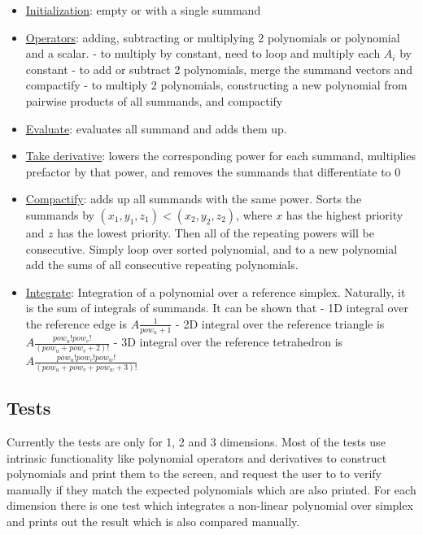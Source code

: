 \documentclass[12pt]{article}
\begin{document}
\begin{itemize}
	\item \uline{Initialization}: empty or with a single summand
	\item \uline{Operators}: adding, subtracting or multiplying 2 polynomials or polynomial and a scalar.
		\subitem - to multiply by constant, need to loop and multiply each $A_i$ by constant
		\subitem - to add or subtract 2 polynomials, merge the summand vectors and compactify
		\subitem - to multiply 2 polynomials, constructing a new polynomial from pairwise products of all summands, and compactify
	\item \uline{Evaluate}: evaluates all summand and adds them up.
	\item \uline{Take derivative}: lowers the corresponding power for each summand, multiplies prefactor by that power, and removes the summands that differentiate to 0
	\item \uline{Compactify}: adds up all summands with the same power. Sorts the summands by $(x_1,y_1,z_1) < (x_2, y_2, z_2)$, where $x$ has the highest priority and $z$ has the lowest priority. Then all of the repeating powers will be consecutive. Simply loop over sorted polynomial, and to a new polynomial add the sums of all consecutive repeating polynomials.
	\item \uline{Integrate}: Integration of a polynomial over a reference simplex. Naturally, it is the sum of integrals of summands. It can be shown that
		\subitem - 1D integral over the reference edge is $A \frac{1}{pow_u + 1}$
		\subitem - 2D integral over the reference triangle is $A \frac{pow_u! pow_v!}{(pow_u + pow_v + 2)!}$
		\subitem - 3D integral over the reference tetrahedron is $A \frac{pow_u! pow_v! pow_w!}{(pow_u + pow_v + pow_w + 3)!}$
\end{itemize}

\subsection{Tests}

\noindent
Currently the tests are only for 1, 2 and 3 dimensions. Most of the tests use intrinsic functionality like polynomial operators and derivatives to construct polynomials and print them to the screen, and request the user to to verify manually if they match the expected polynomials which are also printed. For each dimension there is one test which integrates a non-linear polynomial over simplex and prints out the result which is also compared manually. \\
\end{document}
